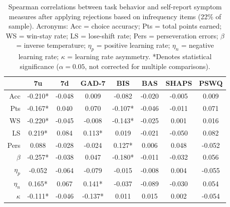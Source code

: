 \documentclass[a4paper,notitlepage,12pt]{article}
\begin{document}
\begin{refsection}[supp]
\begin{table}[H]
\centering
\small
\begin{tabular}{rccccccc}
\toprule
{} &       7u &      7d &    GAD-7 &      BIS &     BAS &   SHAPS &    PSWQ \\
\midrule
Acc      &  -0.210* &  -0.048 &    0.009 &   -0.082 &  -0.020 &  -0.005 &   0.009 \\
Pts      &  -0.167* &   0.040 &    0.070 &  -0.107* &  -0.046 &  -0.011 &   0.071 \\
WS       &  -0.220* &  -0.045 &   -0.008 &  -0.143* &  -0.025 &   0.001 &   0.016 \\
LS       &   0.219* &   0.084 &   0.113* &    0.019 &  -0.021 &  -0.050 &   0.082 \\
Pers     &    0.088 &  -0.028 &   -0.024 &   0.127* &   0.006 &   0.048 &  -0.052 \\
$\beta$  &  -0.257* &  -0.038 &    0.047 &  -0.180* &  -0.011 &  -0.032 &   0.056 \\
$\eta_p$ &   -0.052 &  -0.064 &   -0.079 &   -0.015 &  -0.008 &   0.004 &  -0.055 \\
$\eta_n$ &   0.165* &   0.067 &   0.141* &   -0.037 &  -0.089 &  -0.030 &   0.054 \\
$\kappa$ &  -0.111* &  -0.046 &  -0.137* &    0.011 &   0.015 &   0.002 &  -0.054 \\
\bottomrule
\end{tabular}
\caption{Spearman correlations between task behavior and self-report symptom measures after applying rejections based on infrequency items (22\% of sample). Acronyms: Acc = choice accuracy; Pts = total points earned; WS = win-stay rate; LS = lose-shift rate; Pers = perseveration errors; $\beta$ = inverse temperature; $\eta_p$ = positive learning rate; $\eta_n$ = negative learning rate; $\kappa$ = learning rate asymmetry. *Denotes statistical significance ($\alpha=0.05$, not corrected for multiple comparisons).}
\end{table}


\end{refsection}
\end{document}
